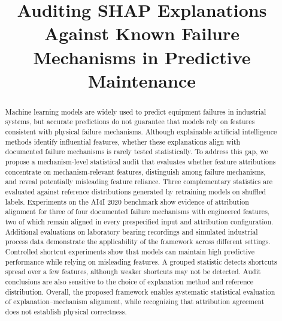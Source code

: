 \documentclass[conference]{IEEEtran}
\begin{document}

\title{Auditing SHAP Explanations Against Known Failure Mechanisms in Predictive Maintenance\\
}

\author{
}

\maketitle

\begin{abstract}
Machine learning models are widely used to predict equipment failures in industrial systems, but accurate predictions do not guarantee that models rely on features consistent with physical failure mechanisms. Although explainable artificial intelligence methods identify influential features, whether these explanations align with documented failure mechanisms is rarely tested statistically. To address this gap, we propose a mechanism-level statistical audit that evaluates whether feature attributions concentrate on mechanism-relevant features, distinguish among failure mechanisms, and reveal potentially misleading feature reliance. Three complementary statistics are evaluated against reference distributions generated by retraining models on shuffled labels. Experiments on the AI4I 2020 benchmark show evidence of attribution alignment for three of four documented failure mechanisms with engineered features, two of which remain aligned in every prespecified input and attribution configuration. Additional evaluations on laboratory bearing recordings and simulated industrial process data demonstrate the applicability of the framework across different settings. Controlled shortcut experiments show that models can maintain high predictive performance while relying on misleading features. A grouped statistic detects shortcuts spread over a few features, although weaker shortcuts may not be detected. Audit conclusions are also sensitive to the choice of explanation method and reference distribution. Overall, the proposed framework enables systematic statistical evaluation of explanation–mechanism alignment, while recognizing that attribution agreement does not establish physical correctness.
\end{abstract}
\end{document}

